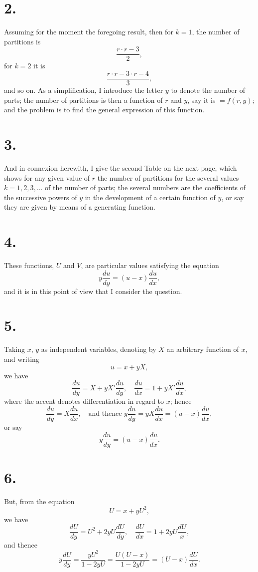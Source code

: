 \documentclass[11pt,a4paper]{article}
\begin{document}
\section*{2.}
Assuming for the moment the foregoing result, then for $k=1$, the number of partitions is
\[
\frac{r \cdot r - 3}{2},
\]
for $k = 2$ it is
\[
\frac{r \cdot r - 3 \cdot r - 4}{3},
\]
and so on. As a simplification, I introduce the letter $y$ to denote the number of parts; the number of partitions is then a function of $r$ and $y$, say it is $= f(r, y)$; and the problem is to find the general expression of this function.

\section*{3.}
And in connexion herewith, I give the second Table on the next page, which shows for any given value of $r$ the number of partitions for the several values $k = 1, 2, 3, \ldots$ of the number of parts; the several numbers are the coefficients of the successive powers of $y$ in the development of a certain function of $y$, or say they are given by means of a generating function.

\section*{4.}
These functions, $U$ and $V$, are particular values satisfying the equation
\[
y\frac{du}{dy} = (u - x)\frac{du}{dx},
\]
and it is in this point of view that I consider the question.

\section*{5.}
Taking $x$, $y$ as independent variables, denoting by $X$ an arbitrary function of $x$, and writing
\[
u = x + yX,
\]
we have
\[
\frac{du}{dy} = X + yX'\frac{du}{dy}, \quad \frac{du}{dx} = 1 + yX'\frac{du}{dx},
\]
where the accent denotes differentiation in regard to $x$; hence
\[
\frac{du}{dy} = X\frac{du}{dx}, \quad \text{and thence } y\frac{du}{dy} = yX\frac{du}{dx} = (u - x)\frac{du}{dx},
\]
or say
\[
y\frac{du}{dy} = (u - x)\frac{du}{dx}.
\]

\section*{6.}
But, from the equation
\[
U = x + yU^2,
\]
we have
\[
\frac{dU}{dy} = U^2 + 2yU\frac{dU}{dy}, \quad \frac{dU}{dx} = 1 + 2yU\frac{dU}{x},
\]
and thence
\[
y\frac{dU}{dy} = \frac{yU^2}{1 - 2yU} = \frac{U(U - x)}{1 - 2yU} = (U - x)\frac{dU}{dx}.
\]
\end{document}
